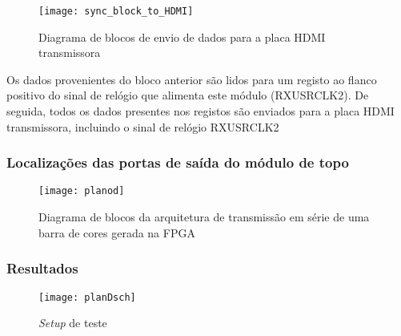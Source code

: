 \begin{figure}[h!]
	\begin{center}
		\leavevmode
		\texttt{[image: sync\_block\_to\_HDMI]}
		\captionsetup{width=1.0\linewidth}
		\caption[Diagrama de blocos de envio de dados para a placa HDMI transmissora]{Diagrama de blocos de envio de dados para a placa HDMI transmissora}
		\label{fig:sync_block_to_HDMI}
	\end{center}
\end{figure}

Os dados provenientes do bloco anterior são lidos para um registo ao flanco positivo do sinal de relógio que alimenta este módulo (RXUSRCLK2). De seguida, todos os dados presentes nos registos são enviados para a placa HDMI transmissora, incluindo o sinal de relógio RXUSRCLK2

\subsubsection*{Localizações das portas de saída do módulo de topo} \label{subsub:serial_locs_planD}


\begin{figure}[h!]
	\begin{center}
		\leavevmode
		\texttt{[image: planod]}
		\captionsetup{width=1.0\linewidth}
		\caption[Diagrama de blocos da arquitetura de transmissão em série de uma barra de cores gerada na FPGA]{Diagrama de blocos da arquitetura de transmissão em série de uma barra de cores gerada na FPGA}
		\label{fig:planD}
	\end{center}
\end{figure}



%
%
%
\subsubsection*{Resultados} \label{subsub:serial_planDresults}


\begin{figure}[h!]
	\begin{center}
		\leavevmode
		\texttt{[image: planDsch]}
		\captionsetup{width=1.0\linewidth}
		\caption[\textit{Setup} de teste]{\textit{Setup} de teste}
		\label{fig:planD_setup}
	\end{center}
\end{figure}





